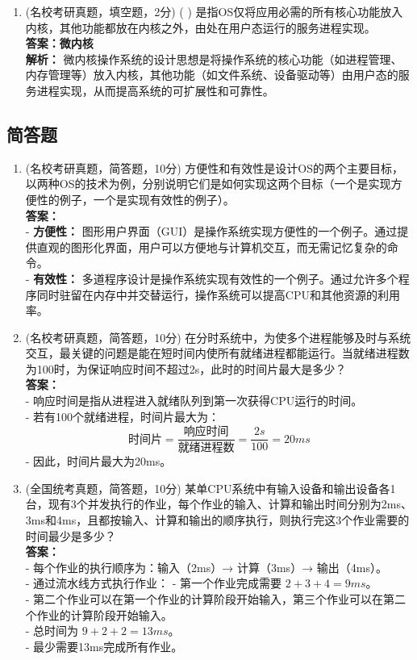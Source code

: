 \documentclass[lang=cn,newtx,10pt,scheme=chinese]{../../elegantbook}
\begin{document}
\begin{enumerate}
    \item (名校考研真题，填空题，2分) (    ) 是指OS仅将应用必需的所有核心功能放入内核，其他功能都放在内核之外，由处在用户态运行的服务进程实现。\\
    \textbf{答案：微内核}\\
    \textbf{解析：} 微内核操作系统的设计思想是将操作系统的核心功能（如进程管理、内存管理等）放入内核，其他功能（如文件系统、设备驱动等）由用户态的服务进程实现，从而提高系统的可扩展性和可靠性。\\
\end{enumerate}

\subsection{简答题}
\begin{enumerate}
    \item (名校考研真题，简答题，10分) 方便性和有效性是设计OS的两个主要目标，以两种OS的技术为例，分别说明它们是如何实现这两个目标（一个是实现方便性的例子，一个是实现有效性的例子）。\\
    \textbf{答案：}\\
    - \textbf{方便性：} 图形用户界面（GUI）是操作系统实现方便性的一个例子。通过提供直观的图形化界面，用户可以方便地与计算机交互，而无需记忆复杂的命令。\\
    - \textbf{有效性：} 多道程序设计是操作系统实现有效性的一个例子。通过允许多个程序同时驻留在内存中并交替运行，操作系统可以提高CPU和其他资源的利用率。\\
    
    \item (名校考研真题，简答题，10分) 在分时系统中，为使多个进程能够及时与系统交互，最关键的问题是能在短时间内使所有就绪进程都能运行。当就绪进程数为100时，为保证响应时间不超过2s，此时的时间片最大是多少？\\
    \textbf{答案：}\\
    - 响应时间是指从进程进入就绪队列到第一次获得CPU运行的时间。\\
    - 若有100个就绪进程，时间片最大为：
    \[
    \text{时间片} = \frac{\text{响应时间}}{\text{就绪进程数}} = \frac{2s}{100} = 20ms
    \]
    - 因此，时间片最大为20ms。\\
    
    \item (全国统考真题，简答题，10分) 某单CPU系统中有输入设备和输出设备各1台，现有3个并发执行的作业，每个作业的输入、计算和输出时间分别为2ms、3ms和4ms，且都按输入、计算和输出的顺序执行，则执行完这3个作业需要的时间最少是多少？\\
    \textbf{答案：}\\
    - 每个作业的执行顺序为：输入（2ms）→ 计算（3ms）→ 输出（4ms）。\\
    - 通过流水线方式执行作业：
        - 第一个作业完成需要 \(2 + 3 + 4 = 9ms\)。\\
        - 第二个作业可以在第一个作业的计算阶段开始输入，第三个作业可以在第二个作业的计算阶段开始输入。\\
        - 总时间为 \(9 + 2 + 2 = 13ms\)。\\
    - 最少需要13ms完成所有作业。\\
    

\end{enumerate}
\end{document}
